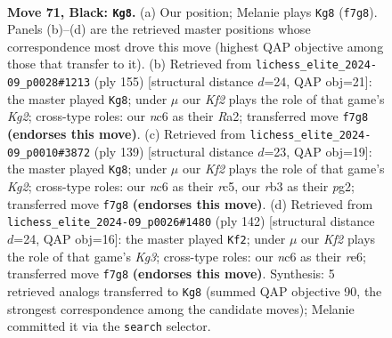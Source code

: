 \documentclass[11pt]{article}
\begin{document}
\clearpage

\begin{figure}[p]\centering
\begin{subfigure}{0.46\textwidth}\centering
\resizebox{\linewidth}{!}{%
\newchessgame
\chessboard[
  setfen={8/5kp1/2N2p2/7p/3P3P/1R4PK/3r4/8 b - - 36 71},
  showmover=false,
  pgfstyle=straightmove, color=movearrow, markmove={f7-g8}
]}
\caption{}
\end{subfigure}\hfill
\begin{subfigure}{0.46\textwidth}\centering
\resizebox{\linewidth}{!}{%
\newchessgame
\chessboard[
  setfen={8/5pk1/3R2p1/7p/5P1P/6PK/r7/8 b - - 32 78},
  showmover=false,
  pgfstyle=straightmove, color=movearrow, markmove={g7-g8}
]}
\caption{}
\end{subfigure}
\\[4pt]
\begin{subfigure}{0.46\textwidth}\centering
\resizebox{\linewidth}{!}{%
\newchessgame
\chessboard[
  setfen={8/5pk1/6p1/2R4p/4P2P/5PK1/6P1/7r b - - 26 70},
  showmover=false,
  pgfstyle=straightmove, color=movearrow, markmove={g7-g8}
]}
\caption{}
\end{subfigure}\hfill
\begin{subfigure}{0.46\textwidth}\centering
\resizebox{\linewidth}{!}{%
\newchessgame
\chessboard[
  setfen={8/5pk1/4r2p/2R3pP/6P1/5PK1/8/8 w - - 13 72},
  showmover=false,
  pgfstyle=straightmove, color=movearrow, markmove={g3-f2}
]}
\caption{}
\end{subfigure}
\caption{\textbf{Move 71, Black: \texttt{Kg8}.} (a) Our position; Melanie plays \texttt{Kg8} (\texttt{f7g8}). Panels (b)--(d) are the retrieved master positions whose correspondence most drove this move (highest QAP objective among those that transfer to it). (b) Retrieved from \texttt{lichess\_elite\_2024-09\_p0028\#1213} (ply 155) [structural distance $d$=24, QAP obj=21]: the master played \texttt{Kg8}; under $\mu$ our \emph{Kf2} plays the role of that game's \emph{Kg2}; cross-type roles: our \emph{n}c6 as their \emph{R}a2; transferred move \texttt{f7g8} \textbf{(endorses this move)}. (c) Retrieved from \texttt{lichess\_elite\_2024-09\_p0010\#3872} (ply 139) [structural distance $d$=23, QAP obj=19]: the master played \texttt{Kg8}; under $\mu$ our \emph{Kf2} plays the role of that game's \emph{Kg2}; cross-type roles: our \emph{n}c6 as their \emph{r}c5, our \emph{r}b3 as their \emph{p}g2; transferred move \texttt{f7g8} \textbf{(endorses this move)}. (d) Retrieved from \texttt{lichess\_elite\_2024-09\_p0026\#1480} (ply 142) [structural distance $d$=24, QAP obj=16]: the master played \texttt{Kf2}; under $\mu$ our \emph{Kf2} plays the role of that game's \emph{Kg3}; cross-type roles: our \emph{n}c6 as their \emph{r}e6; transferred move \texttt{f7g8} \textbf{(endorses this move)}. Synthesis: 5 retrieved analogs transferred to \texttt{Kg8} (summed QAP objective 90, the strongest correspondence among the candidate moves); Melanie committed it via the \texttt{search} selector.}
\label{fig:thought-m141}
\end{figure}
\end{document}
